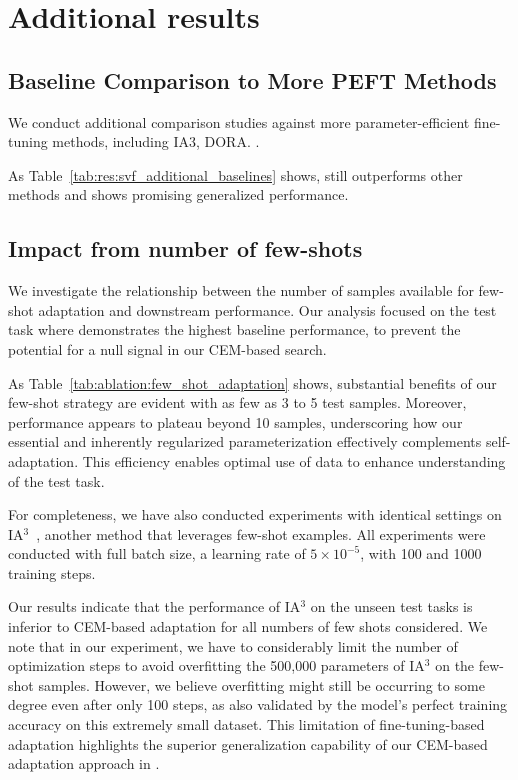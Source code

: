 \section{Additional results}
\label{app:sec:additional_exp}

\subsection{Baseline Comparison to More PEFT Methods}

We conduct additional comparison studies against more parameter-efficient fine-tuning methods, including IA3\cite{liu2022few}, DORA. \cite{liu2024dora}.  

As Table~\ref{tab:res:svf_additional_baselines} shows, \svdacro still outperforms other methods and shows promising generalized performance.

\subsection{Impact from number of few-shots}
\label{app:sec:ablation_few_shots}



We investigate the relationship between the number of samples available for few-shot adaptation and downstream performance.
Our analysis focused on the test task where \llama demonstrates the highest baseline performance, to prevent the potential for a null signal in our CEM-based search.

As Table~\ref{tab:ablation:few_shot_adaptation} shows, substantial benefits of our few-shot strategy are evident with as few as 3 to 5 test samples.
Moreover, performance appears to plateau beyond 10 samples, underscoring how our essential and inherently regularized \svdacro parameterization effectively complements self-adaptation.
This efficiency enables optimal use of data to enhance understanding of the test task.

For completeness, we have also conducted experiments with identical settings on IA$^3$~\citep{liu2022few}, another method that leverages few-shot examples.
All experiments were conducted with full batch size, a learning rate of $5 \times 10^{-5}$, with 100 and 1000 training steps.

Our results indicate that the performance of IA$^3$ on the unseen test tasks is inferior to CEM-based adaptation for all numbers of few shots considered.
We note that in our experiment, we have to considerably limit the number of optimization steps to avoid overfitting the 500,000 parameters of IA$^3$ on the few-shot samples. However, we believe overfitting might still be occurring to some degree even after only 100 steps, as also validated by the model’s perfect training accuracy on this extremely small dataset.
This limitation of fine-tuning-based adaptation highlights the superior generalization capability of our CEM-based adaptation approach in \implname.



